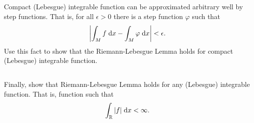 \documentclass[11pt,letterpaper]{article}
\begin{document}
\subsection{}
Compact (Lebesgue) integrable function can be approximated arbitrary well by step functions. That is, for all $\epsilon>0$ there is a step function $\varphi$ such that
\begin{align}
    \left| \int_M f \;\mathrm{d} x - \int_M \varphi \;\mathrm{d} x \right| < \epsilon.
\end{align}
Use this fact to show that the Riemann-Lebesgue Lemma holds for compact (Lebesgue) integrable function.

\subsection{}
Finally, show that Riemann-Lebesgue Lemma holds for any (Lebesgue) integrable function. That is, function such that
\begin{align}
    \int_\mathbb{R} |f|\;\mathrm{d} x < \infty.
\end{align}


\vfill
\printbibliography
\end{document}
